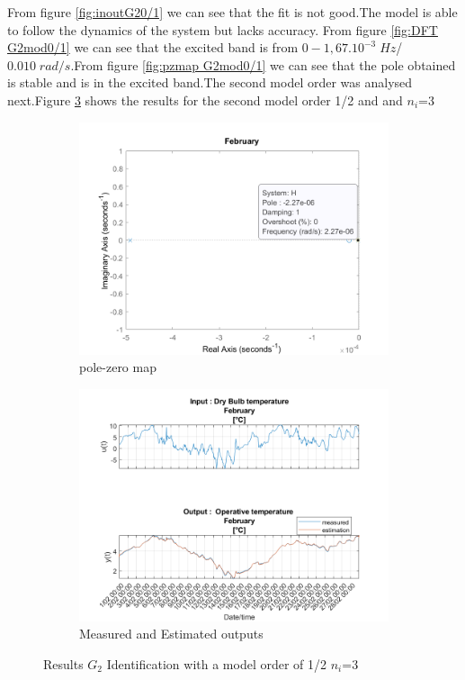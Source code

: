 \documentclass[a4paper,12pt]{article}
\numberwithin{equation}{section}
\begin{document}
\noindent
From figure \ref{fig:inoutG20/1} we can see that the fit is not good.The model is able to follow the dynamics of the system but lacks accuracy. From figure \ref{fig:DFT G2mod0/1} we can see that the excited band is from $0-1,67.10^{-3}\;Hz$/ $0.010\;rad/s$.From figure \ref{fig:pzmap G2mod0/1} we can see that the pole obtained is stable and is in the excited band.The second model order was analysed next.Figure \ref{fig:G2mod1/2} shows the results for the second model order 1/2 and and $n_{i}$=3

\begin{figure}[H]
\centering
\begin{subfigure}{.5\textwidth}
  \centering
  \includegraphics[width=.7\linewidth]{G2mod12pzmap.png}
  \caption{pole-zero map}
  \label{fig:pzmap G2mod1/2}
\end{subfigure}

\begin{subfigure}{\textwidth}
  \centering
  \includegraphics[scale=0.38]{G2mod12InOut.png}
  \caption{Measured and Estimated outputs}
  \label{fig:inoutG21/2}
\end{subfigure}
\caption{Results $G_{2}$ Identification with a model order of 1/2 $n_{i}$=3 }
\label{fig:G2mod1/2}
\end{figure}
\end{document}
